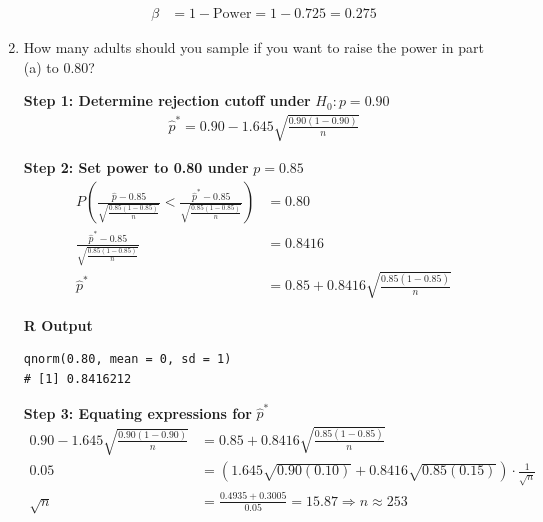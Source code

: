 \begin{example}
\begin{enumerate}[label=\textbf{\alph*.}]
\begin{align*}
\beta &= 1 - \text{Power} = 1 - 0.725 = 0.275
\end{align*}

\item How many adults should you sample if you want to raise the power in part (a) to 0.80?

\textbf{Step 1: Determine rejection cutoff under } $H_0 : p = 0.90$
\begin{align*}
\hat{p}^* = 0.90 - 1.645 \sqrt{\frac{0.90(1 - 0.90)}{n}}
\end{align*}

\textbf{Step 2: Set power to 0.80 under } $p = 0.85$
\[
\begin{aligned}
P\left( \frac{\hat{p} - 0.85}{\sqrt{\frac{0.85(1 - 0.85)}{n}}} < \frac{\hat{p}^* - 0.85}{\sqrt{\frac{0.85(1 - 0.85)}{n}}} \right) &= 0.80 \\
\frac{\hat{p}^* - 0.85}{\sqrt{\frac{0.85(1 - 0.85)}{n}}} &= 0.8416 \\
\hat{p}^* &= 0.85 + 0.8416 \sqrt{\frac{0.85(1 - 0.85)}{n}}
\end{aligned}
\]

\noindent\textbf{R Output}
\begin{tcolorbox}[colback=gray!10, colframe=black!45, arc=2mm]
\begin{verbatim}
qnorm(0.80, mean = 0, sd = 1)
# [1] 0.8416212
\end{verbatim}
\end{tcolorbox}

\textbf{Step 3: Equating expressions for } $\hat{p}^*$
\[
\begin{aligned}
0.90 - 1.645 \sqrt{\frac{0.90(1 - 0.90)}{n}} &= 0.85 + 0.8416 \sqrt{\frac{0.85(1 - 0.85)}{n}} \\
0.05 &= \left(1.645 \sqrt{0.90(0.10)} + 0.8416 \sqrt{0.85(0.15)}\right) \cdot \frac{1}{\sqrt{n}} \\
\sqrt{n} &= \frac{0.4935 + 0.3005}{0.05} = 15.87 \Rightarrow n \approx 253
\end{aligned}
\]

\end{enumerate}
\end{example}
